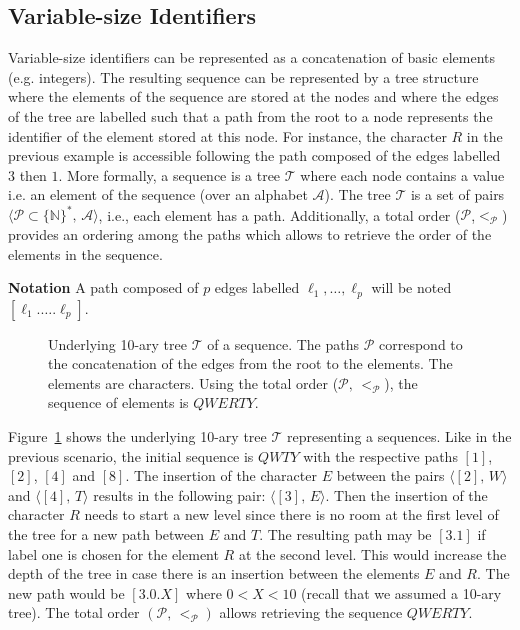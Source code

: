 \subsection{Variable-size Identifiers}

Variable-size identifiers can be represented as a concatenation of basic
elements (e.g. integers). The resulting sequence can be represented by a tree
structure where the elements of the sequence are stored at the nodes and where
the edges of the tree are labelled such that a path from the root to a node
represents the identifier of the element stored at this node. For instance, the
character $R$ in the previous example is accessible following the path composed
of the edges labelled $3$ then $1$. More formally, a sequence is a tree
$\mathcal{T}$ where each node contains a value i.e. an element of the sequence
(over an alphabet $\mathcal{A}$). The tree $\mathcal{T}$ is a set of pairs
$\langle\mathcal{P}\subset\{\mathbb{N}\}^*,\, \mathcal{A} \rangle$, i.e., each
element has a path. Additionally, a total order
($\mathcal{P}$,$<_{\mathcal{P}}$) provides an ordering among the paths which
allows to retrieve the order of the elements in the sequence.

\noindent \textbf{Notation} A path composed of $p$ edges labelled
$\ell_1,\ldots,\ell_p$ will be noted $[\ell_1.\ldots.\ell_p]$.

\begin{figure}
  \centering
  
  \caption{\label{fig:treemodelexample} Underlying 10-ary tree $\mathcal{T}$ of
    a sequence. The paths $\mathcal{P}$ correspond to the concatenation of the
    edges from the root to the elements. The elements are characters. Using the
    total order ($\mathcal{P},\, <_\mathcal{P}$), the sequence of elements is
    $QWERTY$.}
\end{figure}

Figure~\ref{fig:treemodelexample} shows the underlying 10-ary tree
$\mathcal{T}$ representing a sequences. Like in the previous scenario, the
initial sequence is $QWTY$ with the respective paths $[1]$, $[2]$, $[4]$ and
$[8]$. The insertion of the character $E$ between the pairs
$\langle [2],\, W\rangle$ and $\langle [4],\, T\rangle$ results in the
following pair: $\langle [3],\, E \rangle$. Then the insertion of the character
$R$ needs to start a new level since there is no room at the first level of the
tree for a new path between $E$ and $T$. The resulting path may be $[3.1]$ if
label one is chosen for the element $R$ at the second level. This would
increase the depth of the tree in case there is an insertion between the
elements $E$ and $R$. The new path would be $[3.0.X]$ where $0<X<10$ (recall
that we assumed a 10-ary tree). The total order $(\mathcal{P},\,<_\mathcal{P})$
allows retrieving the sequence $QWERTY$.

